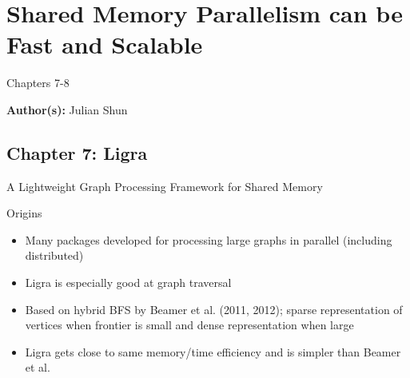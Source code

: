 \section{Shared Memory Parallelism can be Fast and Scalable}
Chapters 7-8

\textbf{Author(s):} Julian Shun

\subsection{Chapter 7: Ligra}
A Lightweight Graph Processing Framework for Shared Memory

Origins
\begin{itemize}
    \item Many packages developed for processing large graphs in parallel (including distributed)
    \item Ligra is especially good at graph traversal
    \item Based on hybrid BFS by Beamer et al. (2011, 2012); sparse representation of vertices when frontier is small and dense representation when large
    \item Ligra gets close to same memory/time efficiency and is simpler than Beamer et al.
\end{itemize}

